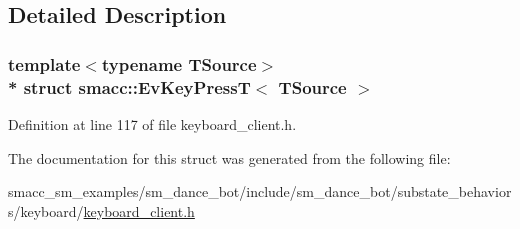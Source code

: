 \subsection{Detailed Description}
\subsubsection*{template$<$typename T\+Source$>$\\*
struct smacc\+::\+Ev\+Key\+Press\+T$<$ T\+Source $>$}



Definition at line 117 of file keyboard\+\_\+client.\+h.



The documentation for this struct was generated from the following file\+:\begin{DoxyCompactItemize}
\item 
smacc\+\_\+sm\+\_\+examples/sm\+\_\+dance\+\_\+bot/include/sm\+\_\+dance\+\_\+bot/substate\+\_\+behaviors/keyboard/\hyperlink{keyboard__client_8h}{keyboard\+\_\+client.\+h}\end{DoxyCompactItemize}
